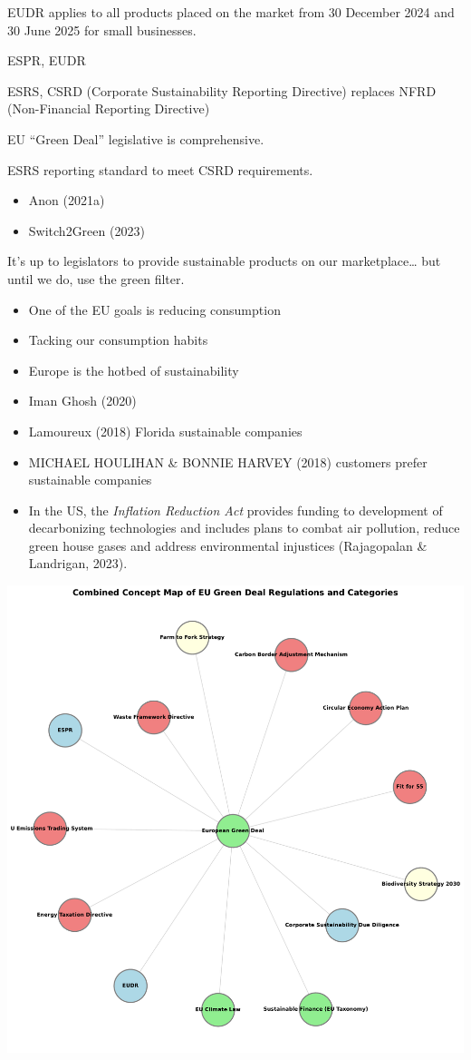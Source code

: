 \documentclass[
  letterpaper,
  DIV=11,
  numbers=noendperiod]{scrartcl}
\providecommand{\tightlist}{%
  \setlength{\itemsep}{0pt}\setlength{\parskip}{0pt}}\usepackage{longtable,booktabs,array}
\begin{document}
EUDR applies to all products placed on the market from 30 December 2024
and 30 June 2025 for small businesses.

ESPR, EUDR

ESRS, CSRD (Corporate Sustainability Reporting Directive) replaces NFRD
(Non-Financial Reporting Directive)

EU ``Green Deal'' legislative is comprehensive.

ESRS reporting standard to meet CSRD requirements.

\begin{itemize}
\tightlist
\item
  Anon (2021a)
\item
  Switch2Green (2023)
\end{itemize}

It's up to legislators to provide sustainable products on our
marketplace\ldots{} but until we do, use the green filter.

\begin{itemize}
\tightlist
\item
  One of the EU goals is reducing consumption
\item
  Tacking our consumption habits
\item
  Europe is the hotbed of sustainability
\item
  Iman Ghosh (2020)
\item
  Lamoureux (2018) Florida sustainable companies
\item
  MICHAEL HOULIHAN \& BONNIE HARVEY (2018) customers prefer sustainable
  companies
\item
  In the US, the \emph{Inflation Reduction Act} provides funding to
  development of decarbonizing technologies and includes plans to combat
  air pollution, reduce green house gases and address environmental
  injustices (Rajagopalan \& Landrigan, 2023).
\end{itemize}

\includegraphics{_thesis_files/figure-pdf/cell-19-output-1.pdf}
\end{document}
